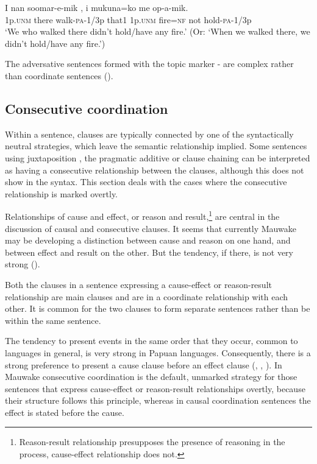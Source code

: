 \ea%
\label{ex:8:x1396}
\gll I  nan  soomar-e-mik ,  i  mukuna=ko  me op-a-mik.\\
1p.\textsc{unm}  there  walk-\textsc{pa}-1/3p that1  1p.\textsc{unm}  fire=\textsc{nf}  not hold-\textsc{pa}-1/3p\\
\glt`We who walked there didn't hold/have any fire.' (Or: `When we walked there, we didn't hold/have any fire.')
\z

The adversative sentences formed with the topic marker - are complex rather than coordinate sentences ().

\subsection{Consecutive coordination}

Within a sentence, clauses are typically connected by one of the syntactically neutral strategies, which leave the semantic relationship implied. Some sentences using juxtaposition , the pragmatic additive   or clause chaining  can be interpreted as having a consecutive relationship between the clauses, although this does not show in the syntax. This section deals with the cases where the consecutive relationship is marked overtly.

Relationships of cause and effect, or reason and result,\footnote{Reason-result relationship presupposes the presence of reasoning in the process, cause-effect relationship does not.}  are central in the discussion of causal and consecutive clauses. It seems that currently Mauwake may be developing a distinction between cause and reason on one hand, and between effect and result on the other. But the tendency, if there, is not very strong (). 

Both the clauses in a sentence expressing a cause-effect or reason-result relationship are main clauses and are in a coordinate relationship with each other. It is common for the two clauses to form separate sentences rather than be within the same sentence. 

The tendency to present events in the same order that they occur, common to languages in general, is very strong in Papuan languages. Consequently, there is a strong preference to present a cause clause before an effect clause (\citealt[409]{Haiman1980}, \citealt[59]{Roberts1987}, \citealt{Reesink1987}). In Mauwake consecutive coordination is the default, unmarked strategy for those sentences that express cause-effect or reason-result relationships overtly, because their structure follows this principle, whereas in causal coordination sentences the effect is stated before the cause. 

